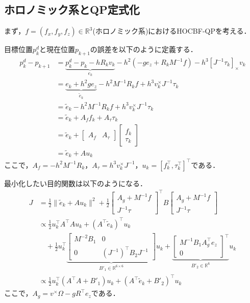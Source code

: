 \subsection{ホロノミック系とQP定式化}

まず，$f = (f_x, f_y, f_z) \in \mathbb{R}^3$(ホロノミック系)におけるHOCBF-QPを考える．

目標位置$p^d_k$と現在位置$p_{k+1}$の誤差を以下のように定義する．
\begin{equation}
\begin{aligned}
p^d_{k} - p_{k+1} &= \underbrace{p^d_{k} - p_k - h R_k v_k}_{e_k} - h^2 (-g e_z + R_k M^{-1} f) - h^3 [J^{-1} \tau_k]_\times v_k \\
&= \underbrace{e_k + h^2 g e_z}_{\tilde{e}_k} - h^2 M^{-1} R_k f + h^3 v_k^\times J^{-1} \tau_k \\
&= \tilde{e}_k - h^2 M^{-1} R_k f + h^3 v_k^\times J^{-1} \tau_k \\
&= \tilde{e}_k + A_f f_k + A_\tau \tau_k \\
&= \tilde{e}_k + \begin{bmatrix} A_f & A_\tau \end{bmatrix} \begin{bmatrix} f_k \\ \tau_k \end{bmatrix} \\
&= \tilde{e}_k + A u_k
\label{eq:position_error}
\end{aligned}
\end{equation}
ここで，$A_f = -h^2 M^{-1} R_k$，$A_\tau = h^3 v_k^\times J^{-1}$，$u_k = [f_k^\top, \tau_k^\top]^\top$である．

最小化したい目的関数は以下のようになる．
\begin{equation}
\begin{aligned}
J &= \frac{1}{2} \|\tilde{e}_k + A u_k\|^2 + \frac{1}{2} \begin{bmatrix} A_g + M^{-1} f \\ J^{-1} \tau \end{bmatrix}^\top B \begin{bmatrix} A_g + M^{-1} f \\ J^{-1} \tau \end{bmatrix} \\
&\propto \frac{1}{2} u_k^\top A^\top A u_k + (A^\top \tilde{e}_k)^\top u_k \\
&\quad + \frac{1}{2} u_k^\top \underbrace{\begin{bmatrix} M^{-2} B_1 & 0 \\ 0 & (J^{-1})^\top B_2 J^{-1} \end{bmatrix}}_{B'_1 \in \mathbb{R}^{6 \times 6}} u_k + \underbrace{\begin{bmatrix} M^{-1} B_1 A_g^\top e_z \\ 0 \end{bmatrix}^\top}_{B'_2 \in \mathbb{R}^{6}} u_k \\
&\propto \frac{1}{2} u_k^\top (A^\top A + B'_1) u_k + (A^\top \tilde{e}_k + B'_2)^\top u_k
\label{eq:objective_function}
\end{aligned}
\end{equation}
ここで，$A_g = v^\times \Omega - g R^\top e_z$である．

